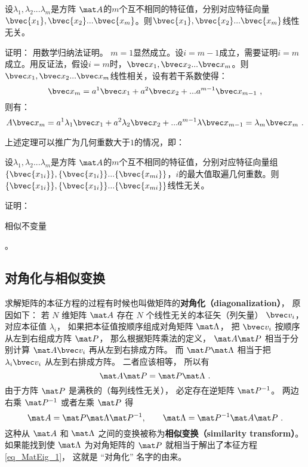 \begin{theorem}{}
设$\lambda_1,\lambda_2...\lambda_m$是方阵 $\mat A$的$m$个互不相同的特征值，分别对应特征向量$\bvec {x_1},\bvec {x_2}...\bvec{x_m}$。则$\bvec {x_1},\bvec {x_2}...\bvec{x_m}$线性无关。
\end{theorem}
证明： 
用数学归纳法证明。
$m=1$显然成立。设$i=m-1$成立，需要证明$i=m$成立。用反证法，假设$i=m$时，$\bvec x_1,\bvec x_2...\bvec x_m$。则$\bvec x_1,\bvec x_2...\bvec x_m$线性相关，设有若干系数使得：
\begin{equation}
\bvec x_m=a^1\bvec x_1+a^2\bvec x_2+...a^{m-1} \bvec x_{m-1}~,
\end{equation}
则有：
\begin{equation}
 A\bvec x_m=a^1\lambda_1\bvec x_1+a^2\lambda_2\bvec x_2+...a^{m-1}\lambda \bvec x_{m-1}=\lambda_m\bvec x_m~.
\end{equation}

上述定理可以推广为几何重数大于$1$的情况，即：
\begin{corollary}{}
设$\lambda_1,\lambda_2...\lambda_m$是方阵 $\mat A$的$m$个互不相同的特征值，分别对应特征向量组$\{\bvec{x_{1i}}\},\{\bvec{x_{1i}}\}...\{\bvec {x_{mi}}\}$，$i$的最大值取遍几何重数。则$\{\bvec{x_{1i}}\},\{\bvec{x_{1i}}\}...\{\bvec {x_{mi}}\}$线性无关。
\end{corollary}
证明：
\begin{theorem}{相似不变量}

\end{theorem}
。

\subsection{对角化与相似变换}
求解矩阵的本征方程的过程有时候也叫做矩阵的\textbf{对角化（diagonalization）}， 原因如下： 若 $N$ 维矩阵 $\mat A$ 存在 $N$ 个线性无关的本征矢（列矢量） $\bvec v_i$， 对应本征值 $\lambda_i$， 如果把本征值按顺序组成对角矩阵 $\mat \Lambda$， 把 $\bvec v_i$ 按顺序从左到右组成方阵 $\mat P$， 那么根据矩阵乘法的定义， $\mat A \mat P$ 相当于分别计算 $\mat A\bvec v_i$ 再从左到右排成方阵。 而 $\mat P\mat\Lambda$ 相当于把 $\lambda_i\bvec v_i$ 从左到右排成方阵。 二者应该相等， 所以有
\begin{equation}
\mat A \mat P = \mat P\mat\Lambda~.
\end{equation}
由于方阵 $\mat P$ 是满秩的（每列线性无关）， 必定存在逆矩阵%
$\mat P^{-1}$。 两边右乘 $\mat P^{-1}$ 或者左乘 $\mat P$ 得
\begin{equation}\label{eq_MatEig_3}
\mat A = \mat P\mat\Lambda\mat P^{-1}, \qquad
\mat \Lambda = \mat P^{-1}\mat A \mat P~.
\end{equation}
这种从 $\mat A$ 和 $\mat\Lambda$ 之间的变换被称为\textbf{相似变换（similarity transform）}。 如果能找到使 $\mat\Lambda$ 为对角矩阵的 $\mat P$ 就相当于解出了本征方程\autoref{eq_MatEig_1}， 这就是 “对角化” 名字的由来。
